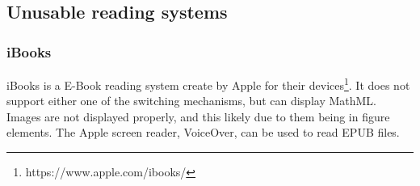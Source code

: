 \subsection{Unusable reading systems}
\subsubsection{iBooks}
iBooks is a E-Book reading system create by Apple for their devices\footnote{https://www.apple.com/ibooks/}. It does not support either one of the switching mechanisms, but can display MathML. Images are not displayed properly, and this likely due to them being in figure elements. The Apple screen reader, VoiceOver, can be used to read EPUB files.

